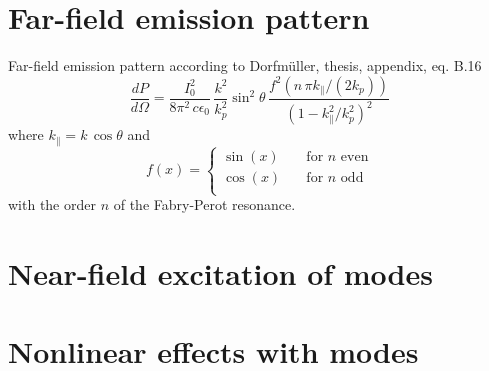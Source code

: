 \section{Far-field emission pattern}

Far-field emission pattern according to Dorfmüller, thesis, appendix, eq. B.16
\begin{equation}
  \frac{dP}{d\Omega} = \frac{I_0^2}{8 \pi^2 \, c \epsilon_0} \, 
  \frac{k^2}{k_p^2} \sin^2 \theta \,
     \frac{f^2 \left( n \, \pi  k_\parallel  / (2 k_p)  \right)} 
     {\left( 1 - k_\parallel^2  / k_p^2 \right)^2
     } 
\end{equation}
where $k_\parallel = k \, \cos \theta$ and
\begin{equation*}
  f(x) = \left\lbrace \begin{matrix}
     \sin(x) & \quad \text{for } n \text{ even} \\ 
    \cos(x)  &\quad \text{for } n \text{ odd} \\ 
  \end{matrix} \right.
\end{equation*}
with the order $n$ of the Fabry-Perot resonance.



\section{Near-field excitation of modes}

\section{Nonlinear effects with  modes}



\printbibliography[segment=\therefsegment,heading=subbibliography]




